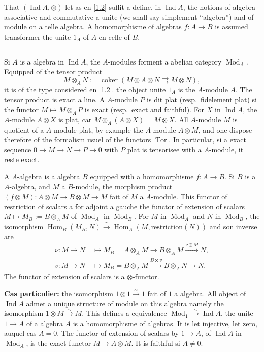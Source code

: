 \documentclass[11pt,a4paper]{article}
\theoremstyle{plain}
\theoremstyle{definition}
\DeclareMathOperator{\Hom}{Hom}
\DeclareMathOperator{\coker}{coker}
\DeclareMathOperator{\Ind}{Ind}
\DeclareMathOperator{\Tor}{Tor}
\newcommand{\simto}{\xrightarrow{\sim}}
\newcommand{\Mod}{\operatorname{Mod}}
\begin{document}
That $(\Ind A,\otimes)$ let as en \ref{1.2} suffit a define, in $\Ind A$, the notions of algebra associative and commutative a unite (we shall say simplement ``algebra'') and of module on a telle algebra. A homomorphisme of algebras $f:A\to B$ is assumed transformer the unite $1_A$ of $A$ en celle of $B$.

\subsection{}\label{2.3}

Si $A$ is a algebra in $\Ind A$, the $A$-modules forment a abelian category $\Mod_A$. Equipped of the tensor product
\[
M\otimes_A N:=\coker(M\otimes A\otimes N\rightrightarrows M\otimes N),
\]
it is of the type considered en \ref{1.2}. the object unite $1_A$ is the $A$-module $A$. The tensor product is exact a line. A $A$-module $P$ is dit plat (resp.~fidelement plat) si the functor $M\mapsto M\otimes_A P$ is exact (resp.~exact and faithful). For $X$ in $\Ind A$, the $A$-module $A\otimes X$ is plat, car $M\otimes_A(A\otimes X)=M\otimes X$. All $A$-module $M$ is quotient of a $A$-module plat, by example the $A$-module $A\otimes M$, and one dispose therefore of the formalism usuel of the functors $\Tor$. In particular, si a exact sequence $0\to M\to N\to P\to 0$ with $P$ plat is tensorisee with a $A$-module, it reste exact.

A $A$-algebra is a algebra $B$ equipped with a homomorphisme $f:A\to B$. Si $B$ is a $A$-algebra, and $M$ a $B$-module, the morphism product $(f\otimes M):A\otimes M\to B\otimes M\to M$ fait of $M$ a $A$-module. This functor of restriction of scalars a for adjoint a gauche the functor of extension of scalars $M\mapsto M_B:=B\otimes_A M$ of $\Mod_A$ in $\Mod_B$. For $M$ in $\Mod_A$ and $N$ in $\Mod_B$, the isomorphism $\Hom_B(M_B,N)\simto\Hom_A(M,\text{restriction}(N))$ and son inverse are
\begin{align*}
\nu:M\to N\ &\mapsto M_B=A\otimes_A M\to B\otimes_A M\xrightarrow{\nu\otimes M}N,\\
v:M\to N\ &\mapsto M_B=B\otimes_A M\xrightarrow{B\otimes v} B\otimes_A N\to N.
\end{align*}
The functor of extension of scalars is a $\otimes$-functor.

\medskip\noindent\textbf{Cas particulier:} the isomorphism $1\otimes1\xrightarrow{\sim}1$ fait of $1$ a algebra. All object of $\Ind A$ admet a unique structure of module on this algebra namely the isomorphism $1\otimes M\xrightarrow{\sim}M$. This defines a equivalence $\Mod_1\xrightarrow{\sim}\Ind A$. the unite $1\to A$ of a algebra $A$ is a homomorphisme of algebras. It is let injective, let zero, auquel cas $A=0$. The functor of extension of scalars by $1\to A$, of $\Ind A$ in $\Mod_A$, is the exact functor $M\mapsto A\otimes M$. It is faithful si $A\neq0$.
\end{document}
